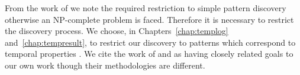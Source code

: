 \medskip

From the work of \cite{mt96,bt98} we note the required restriction to
simple pattern discovery otherwise an NP-complete problem is
faced. Therefore it is necessary to restrict the discovery process. We
choose, in Chapters~\ref{chap:templog} and~\ref{chap:tempresult}, to
restrict our discovery to patterns which correspond to temporal
properties \cite{mp92}. We cite the work of
\cite{dlm98} and \cite{bt98} as having closely related goals to our
own work though 
their methodologies are different.





